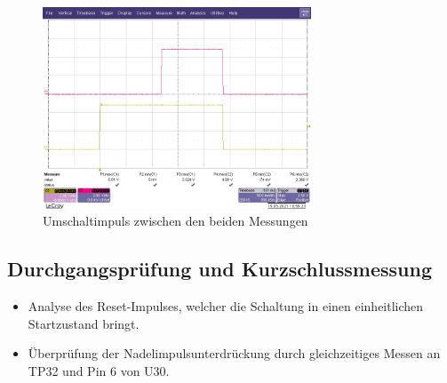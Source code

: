 \begin{figure}[htb]
    \centering
    \begin{minipage}[t]{0.45\linewidth}
        \centering
        \includegraphics[width=8cm]{Bilder/ASwitch-Umschaltung.png}
        \caption{Umschaltimpuls zwischen den beiden Messungen}
    \end{minipage}%
\end{figure}


\newpage
\subsection{Durchgangsprüfung und Kurzschlussmessung}


\begin{itemize}
	\item{Analyse des Reset-Impulses, welcher die Schaltung in einen einheitlichen Startzustand bringt.}
	
	\item{Überprüfung der Nadelimpulsunterdrückung durch gleichzeitiges Messen an TP32 und Pin 6 von U30.}
\end{itemize}


